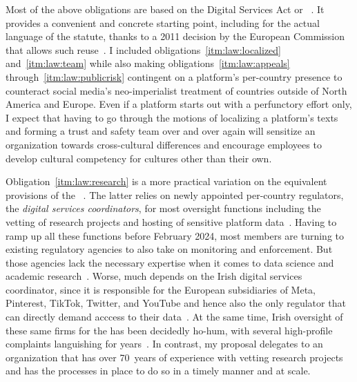 Most of the above obligations are based on the Digital Services Act or
~\cite{EuropeanParliamentAndCouncil2022}. It provides a convenient and
concrete starting point, including for the actual language of the statute,
thanks to a 2011 decision by the European Commission that allows such
reuse~\cite{EuropeanCommission2011}. I included
obligations~\ref{itm:law:localized} and~\ref{itm:law:team} while also making
obligations~\ref{itm:law:appeals} through~\ref{itm:law:publicrisk} contingent on
a platform's per-country presence to counteract social media's neo-imperialist
treatment of countries outside of North America and Europe. Even if a platform
starts out with a perfunctory effort only, I expect that having to go through
the motions of localizing a platform's texts and forming a trust and safety team
over and over again will sensitize an organization towards cross-cultural
differences and encourage employees to develop cultural competency for cultures
other than their own.

Obligation~\ref{itm:law:research} is a more practical variation on the
equivalent provisions of the ~\cite{Vermeulen2022}. The latter relies on
newly appointed per-country regulators, the \emph{digital services
coordinators}, for most oversight functions including the vetting of research
projects and hosting of sensitive platform data~\cite{Jaursch2022,Jaursch2022a}.
Having to ramp up all these functions before February 2024, most  members
are turning to existing regulatory agencies to also take on  monitoring and
enforcement. But those agencies lack the necessary expertise when it comes to
data science and academic research~\cite{Jaursch2023}. Worse, much depends on
the Irish digital services coordinator, since it is responsible for the European
subsidiaries of Meta, Pinterest, TikTok, Twitter, and YouTube and hence also the
only regulator that can directly demand acccess to their
data~\cite{Albert2022,Jaursch2023}. At the same time, Irish oversight of these
same firms for the  has been decidedly ho-hum, with several
high-profile complaints languishing for years~\cite{Burgess2022}. In
contrast, my proposal delegates to an organization that has over 70~years of
experience with vetting research projects and has the processes in place to do
so in a timely manner and at scale.

